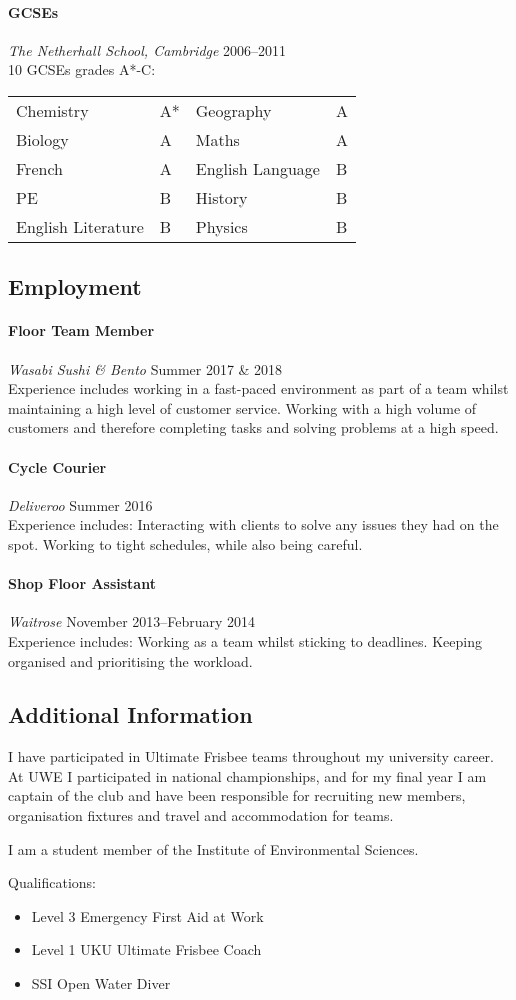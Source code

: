 \documentclass[11pt,a4paper]{article}
\newcommand{\centry}[3]{\paragraph{#1} \textit{#2}%
\hfill#3\\[2pt]}
\begin{document}
\centry{GCSEs}{The Netherhall School, Cambridge}{2006--2011} 
10 GCSEs grades A*-C:
\begin{center}
  \begin{tabular}{llll}
    Chemistry & A* & Geography & A \\
    Biology& A & Maths& A \\
    French& A & English Language& B \\
    PE& B &  History& B\\
    English Literature& B & Physics& B\\
  \end{tabular}
\end{center}

\subsection*{Employment}

\centry{Floor Team Member}{Wasabi Sushi \& Bento}{Summer 2017 \& 2018}

Experience includes working in a fast-paced environment as part of a team whilst 
maintaining a high level of customer service. Working with a high volume of 
customers and therefore completing tasks and solving problems at a high speed. 

\centry{Cycle Courier}{Deliveroo}{Summer 2016}

Experience includes: Interacting with clients to solve any issues they had on 
the spot. Working to tight schedules, while also being careful. 


\centry{Shop Floor Assistant}{Waitrose}{November 2013--February 2014}

Experience includes: Working as a team whilst sticking to deadlines. 
Keeping organised and prioritising the workload.



\subsection*{Additional Information}

I have participated in Ultimate Frisbee teams throughout my university
career. At UWE I participated in national championships, and for my final year
I am captain of the club and have been responsible for recruiting new members,
organisation fixtures and travel and accommodation for teams.


I am a student member of the Institute of Environmental Sciences.


Qualifications:
\begin{itemize}
  \item Level 3 Emergency First Aid at Work    
  \item Level 1 UKU Ultimate Frisbee Coach
  \item SSI Open Water Diver
\end{itemize}
\end{document}
